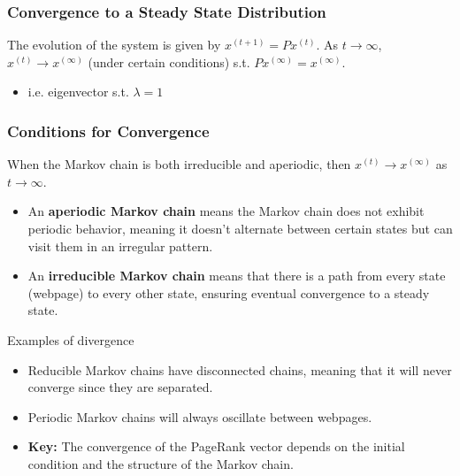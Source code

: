 \subsubsection{Convergence to a Steady State Distribution}
\begin{definition}
    The evolution of the system is given by $x^{(t+1)} = P x^{(t)}$. As $t \to \infty$, $x^{(t)} \to x^{(\infty)}$ (under certain conditions) s.t. $Px^{(\infty)}=x^{(\infty)}$.
    \begin{itemize}
        \item i.e. eigenvector s.t. $\lambda=1$
    \end{itemize}
\end{definition}

\subsubsection{Conditions for Convergence}
\begin{definition}
    When the Markov chain is both irreducible and aperiodic, then $x^{(t)} \to x^{(\infty)}$ as $t \to \infty$.
    \begin{itemize}
        \item An \textbf{aperiodic Markov chain} means the Markov chain does not exhibit periodic behavior, meaning it doesn't alternate between certain states but can visit them in an irregular pattern.
        \item An \textbf{irreducible Markov chain} means that there is a path from every state (webpage) to every other state, ensuring eventual convergence to a steady state.
    \end{itemize}
\end{definition}

\begin{example} Examples of divergence
    \begin{itemize}
        \item Reducible Markov chains have disconnected chains, meaning that it will never converge since they are separated.
        \item Periodic Markov chains will always oscillate between webpages.
        \item \textbf{Key:} The convergence of the PageRank vector depends on the initial condition and the structure of the Markov chain.
    \end{itemize}
\end{example}

